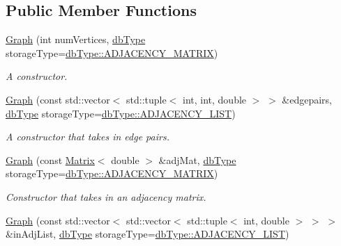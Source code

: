 \subsection*{Public Member Functions}
\begin{DoxyCompactItemize}
\item 
\hyperlink{class_alg_lib_1_1_graph_a365631724157558b77009a33f08104bd}{Graph} (int num\+Vertices, \hyperlink{namespace_alg_lib_a11966d2ea6c430adfb83a6ebaa05e337}{db\+Type} storage\+Type=\hyperlink{namespace_alg_lib_a11966d2ea6c430adfb83a6ebaa05e337a9d8e68c3898f769422174fed0be93fd2}{db\+Type\+::\+A\+D\+J\+A\+C\+E\+N\+C\+Y\+\_\+\+M\+A\+T\+R\+IX})
\begin{DoxyCompactList}\small\item\em A constructor. \end{DoxyCompactList}\item 
\hyperlink{class_alg_lib_1_1_graph_a99e286da01db1f3e8130cbef8ead77d5}{Graph} (const std\+::vector$<$ std\+::tuple$<$ int, int, double $>$ $>$ \&edgepairs, \hyperlink{namespace_alg_lib_a11966d2ea6c430adfb83a6ebaa05e337}{db\+Type} storage\+Type=\hyperlink{namespace_alg_lib_a11966d2ea6c430adfb83a6ebaa05e337a6d02e698876f8aa2b2e975e8c0010c10}{db\+Type\+::\+A\+D\+J\+A\+C\+E\+N\+C\+Y\+\_\+\+L\+I\+ST})
\begin{DoxyCompactList}\small\item\em A constructor that takes in edge pairs. \end{DoxyCompactList}\item 
\hyperlink{class_alg_lib_1_1_graph_a0cc9e7a1ff569edc8c019a5f2d9e4ee8}{Graph} (const \hyperlink{class_alg_lib_1_1_matrix}{Matrix}$<$ double $>$ \&adj\+Mat, \hyperlink{namespace_alg_lib_a11966d2ea6c430adfb83a6ebaa05e337}{db\+Type} storage\+Type=\hyperlink{namespace_alg_lib_a11966d2ea6c430adfb83a6ebaa05e337a9d8e68c3898f769422174fed0be93fd2}{db\+Type\+::\+A\+D\+J\+A\+C\+E\+N\+C\+Y\+\_\+\+M\+A\+T\+R\+IX})
\begin{DoxyCompactList}\small\item\em Constructor that takes in an adjacency matrix. \end{DoxyCompactList}\item 
\hyperlink{class_alg_lib_1_1_graph_abeb1fbb52b7f9ed8346f085b935fb7a8}{Graph} (const std\+::vector$<$ std\+::vector$<$ std\+::tuple$<$ int, double $>$ $>$ $>$ \&in\+Adj\+List, \hyperlink{namespace_alg_lib_a11966d2ea6c430adfb83a6ebaa05e337}{db\+Type} storage\+Type=\hyperlink{namespace_alg_lib_a11966d2ea6c430adfb83a6ebaa05e337a6d02e698876f8aa2b2e975e8c0010c10}{db\+Type\+::\+A\+D\+J\+A\+C\+E\+N\+C\+Y\+\_\+\+L\+I\+ST})

\end{DoxyCompactItemize}
